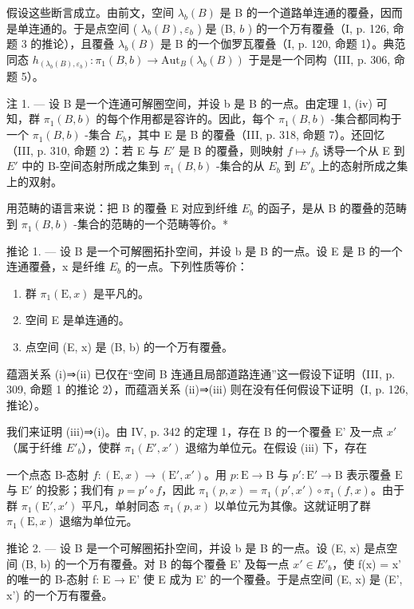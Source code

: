 假设这些断言成立。由前文，空间 \(\lambda_b(B)\) 是 B 的一个道路单连通的覆叠，因而是单连通的。于是点空间 ( \(\lambda_b(B), \varepsilon_b\) ) 是 (B, \(b\) ) 的一个万有覆叠（I, p. 126, 命题 3 的推论），且覆叠 \(\lambda_b(B)\) 是 B 的一个伽罗瓦覆叠（I, p. 120, 命题 1）。典范同态 \(h_{(\lambda_b(B), \varepsilon_b)}: \pi_1(B, b) \to \text{Aut}_B(\lambda_b(B))\) 于是是一个同构（III, p. 306, 命题 5）。

注 1. --- 设 B 是一个连通可解圈空间，并设 b 是 B 的一点。由定理 1, (iv) 可知，群 \(\pi_{1}(B,b)\) 的每个作用都是容许的。因此，每个 \(\pi_{1}(B,b)\) -集合都同构于一个 \(\pi_{1}(B,b)\) -集合 \(E_{b}\)，其中 E 是 B 的覆叠（III, p. 318, 命题 7）。还回忆（III, p. 310, 命题 2）：若 E 与 \(E'\) 是 B 的覆叠，则映射 \(f \mapsto f_{b}\) 诱导一个从 E 到 \(E'\) 中的 B-空间态射所成之集到 \(\pi_{1}(B,b)\) -集合的从 \(E_{b}\) 到 \(E'_{b}\) 上的态射所成之集上的双射。

用范畴的语言来说：把 B 的覆叠 E 对应到纤维 \(E_b\) 的函子，是从 B 的覆叠的范畴到 \(\pi_1(B,b)\) -集合的范畴的一个范畴等价。*

推论 1. --- 设 B 是一个可解圈拓扑空间，并设 b 是 B 的一点。设 E 是 B 的一个连通覆叠，x 是纤维 \(E_{b}\) 的一点。下列性质等价：

\begin{enumerate}
\def\labelenumi{(\roman{enumi})}
\item
  群 \(\pi_{1}(\mathrm{E},x)\) 是平凡的。
\item
  空间 E 是单连通的。
\item
  点空间 (E, x) 是 (B, b) 的一个万有覆叠。
\end{enumerate}

蕴涵关系 (i)⇒(ii) 已仅在“空间 B 连通且局部道路连通”这一假设下证明（III, p. 309, 命题 1 的推论 2），而蕴涵关系 (ii)⇒(iii) 则在没有任何假设下证明（I, p. 126, 推论）。

我们来证明 (iii)⇒(i)。由 IV, p. 342 的定理 1，存在 B 的一个覆叠 E' 及一点 \(x'\)（属于纤维 \(E'_{b}\)），使群 \(\pi_1(E', x')\) 退缩为单位元。在假设 (iii) 下，存在

一个点态 B-态射 \(f \colon (\mathrm{E}, x) \to (\mathrm{E}', x')\)。用 \(p \colon \mathrm{E} \to \mathrm{B}\) 与 \(p' \colon \mathrm{E}' \to \mathrm{B}\) 表示覆叠 \(\mathrm{E}\) 与 \(\mathrm{E}'\) 的投影；我们有 \(p = p' \circ f\)，因此 \(\pi_1(p, x) = \pi_1(p', x') \circ \pi_1(f, x)\)。由于群 \(\pi_1(\mathrm{E}', x')\) 平凡，单射同态 \(\pi_1(p, x)\) 以单位元为其像。这就证明了群 \(\pi_1(\mathrm{E}, x)\) 退缩为单位元。

推论 2. --- 设 B 是一个可解圈拓扑空间，并设 b 是 B 的一点。设 (E, x) 是点空间 (B, b) 的一个万有覆叠。对 B 的每个覆叠 E' 及每一点 \(x' \in E'_{b}\)，使 f(x) = x' 的唯一的 B-态射 f: E → E' 使 E 成为 E' 的一个覆叠。于是点空间 (E, x) 是 (E', x') 的一个万有覆叠。

